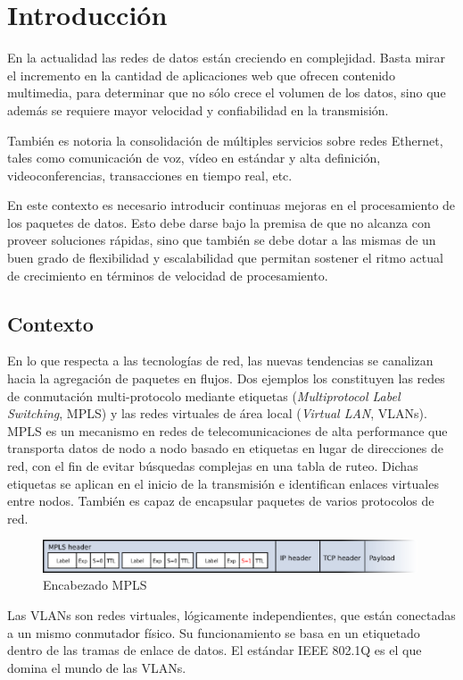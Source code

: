 \chapter{Introducción}

En la actualidad las redes de datos están creciendo en complejidad. Basta mirar el incremento en la cantidad de aplicaciones web que ofrecen contenido multimedia, para determinar que no sólo crece el volumen de los datos, sino que además se requiere mayor velocidad y confiabilidad en la transmisión. 

También es notoria la consolidación de múltiples servicios sobre redes Ethernet, tales como comunicación de voz, vídeo en estándar y alta definición, videoconferencias, transacciones en tiempo real, etc.

En este contexto es necesario introducir continuas mejoras en el procesamiento de los paquetes de datos. Esto debe darse bajo la premisa de que no alcanza con proveer soluciones rápidas, sino que también se debe dotar a las mismas de un buen grado de flexibilidad y escalabilidad que permitan sostener el ritmo actual de crecimiento en términos de velocidad de procesamiento.



\section{Contexto}


En lo que respecta a las tecnologías de red, las nuevas tendencias se canalizan hacia la agregación de paquetes en flujos. Dos ejemplos los constituyen las redes de conmutación multi-protocolo mediante etiquetas (\textit{Multiprotocol Label Switching}, MPLS) y las redes virtuales  de área local (\textit{Virtual LAN}, VLANs). MPLS es un mecanismo en redes de telecomunicaciones de alta performance que transporta datos de nodo a nodo basado en etiquetas en lugar de direcciones de red, con el fin de evitar búsquedas complejas en una tabla de ruteo. Dichas etiquetas se aplican en el inicio de la transmisión e identifican enlaces virtuales entre nodos. También es capaz de encapsular paquetes de varios protocolos de red.

\begin{figure}[h]
  \centering
	\includegraphics[width=0.99\textwidth]{1-introduccion/graf/MPLS_packet.eps}
  \caption{Encabezado MPLS}
  \label{fig:flow}
\end{figure}
Las VLANs son redes virtuales, lógicamente independientes, que están conectadas a un mismo conmutador físico. Su funcionamiento se basa en un etiquetado dentro de las tramas de enlace de datos. El estándar IEEE 802.1Q es el que domina el mundo de las VLANs.


